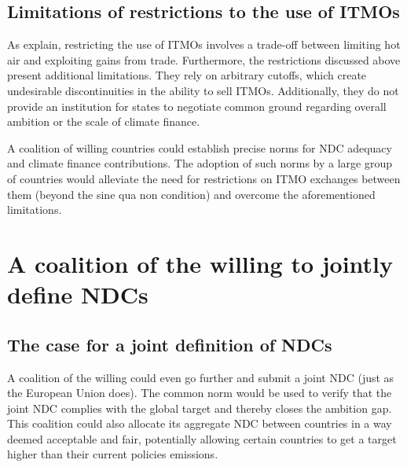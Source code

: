 ﻿\documentclass[12pt,english]{article}
\begin{document}
\subsection{Limitations of restrictions to the use of ITMOs}
As \cite{mehling_governing_2019} explain, restricting the use of ITMOs involves a trade-off between limiting hot air and exploiting gains from trade. Furthermore, the restrictions discussed above present additional limitations. They rely on arbitrary cutoffs, which create undesirable discontinuities in the ability to sell ITMOs. Additionally, they do not provide an institution for states to negotiate %
common ground regarding overall ambition or the scale of climate finance. 

A coalition of willing countries could %
establish precise norms for NDC adequacy and climate finance contributions. The adoption of such norms by a large group of countries would alleviate the need for restrictions on ITMO exchanges between them (beyond the sine qua non condition) and overcome the aforementioned limitations.

\section{A coalition of the willing to jointly define NDCs\label{sec:itmo}}

\subsection{The case for a joint definition of NDCs}\label{subsec:itmo_proposal}

A coalition of the willing could even go further and submit a joint NDC %
(just as the European Union does). 
The common norm would be used to verify that the joint NDC complies with the global target and thereby closes the ambition gap. %
This coalition could also allocate its aggregate NDC between countries in a way deemed acceptable and fair, potentially allowing certain countries to get a target higher than their current policies emissions.
\end{document}
